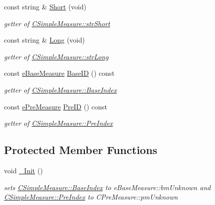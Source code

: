\begin{DoxyCompactItemize}
const string \& \hyperlink{classCSimpleMeasure_ab1e479ebf0d3a428ecd9f6b1daf3fe0c}{Short} (void)
\begin{DoxyCompactList}\small\item\em getter of \hyperlink{classCSimpleMeasure_a39260e6516c163955c34dce6795292ad}{C\+Simple\+Measure\+::str\+Short} \end{DoxyCompactList}\item 
const string \& \hyperlink{classCSimpleMeasure_a62d318d474f4feb9b25e113f47dd45c6}{Long} (void)
\begin{DoxyCompactList}\small\item\em getter of \hyperlink{classCSimpleMeasure_a5761fb46fb35ce577066ef1e7ec1ab2e}{C\+Simple\+Measure\+::str\+Long} \end{DoxyCompactList}\item 
const \hyperlink{BaseMeasure_8h_ac90e5164ccf1f0d648fba7e94b229a11}{e\+Base\+Measure} \hyperlink{classCSimpleMeasure_a8b523b4264aed1ccae15fd39cc7e31f4}{Base\+ID} () const
\begin{DoxyCompactList}\small\item\em getter of \hyperlink{classCSimpleMeasure_a191dbfa4cc374946bf8a82111f827d92}{C\+Simple\+Measure\+::\+Base\+Index} \end{DoxyCompactList}\item 
const \hyperlink{PreMeasure_8h_a6c81167b8d4c2badde42f81cb7214620}{e\+Pre\+Measure} \hyperlink{classCSimpleMeasure_ae2704585c95b6a165e982186afef5556}{Pre\+ID} () const
\begin{DoxyCompactList}\small\item\em getter of \hyperlink{classCSimpleMeasure_aa23ed9eec21adb9a97c90a424e7ee18a}{C\+Simple\+Measure\+::\+Pre\+Index} \end{DoxyCompactList}\end{DoxyCompactItemize}
\subsection*{Protected Member Functions}
\begin{DoxyCompactItemize}
\item 
void \hyperlink{classCSimpleMeasure_ada8744ac5a824143904a2ecaef2b0b70}{\+\_\+\+Init} ()
\begin{DoxyCompactList}\small\item\em sets \hyperlink{classCSimpleMeasure_a191dbfa4cc374946bf8a82111f827d92}{C\+Simple\+Measure\+::\+Base\+Index} to e\+Base\+Measure\+::bm\+Unknown and \hyperlink{classCSimpleMeasure_aa23ed9eec21adb9a97c90a424e7ee18a}{C\+Simple\+Measure\+::\+Pre\+Index} to C\+Pre\+Measure\+::pm\+Unknown \end{DoxyCompactList}\end{DoxyCompactItemize}
